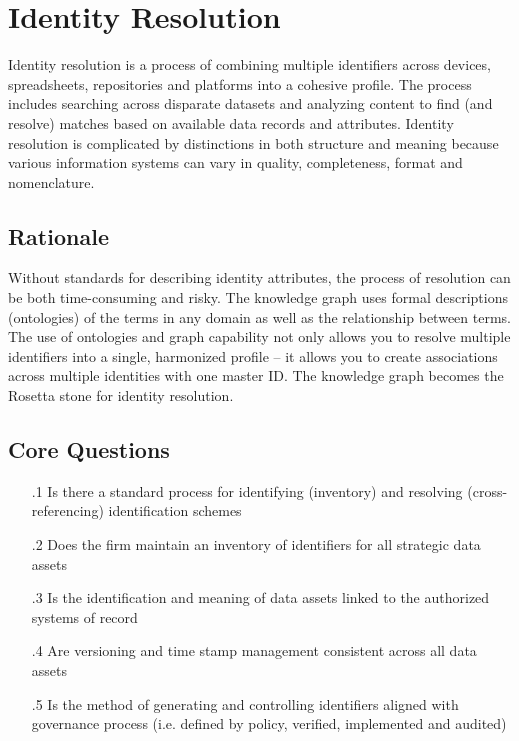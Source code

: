\section{Identity Resolution}\label{sec:b-2-1} %

Identity resolution is a process of combining multiple identifiers across devices, spreadsheets, repositories and
platforms into a cohesive profile.
The process includes searching across disparate datasets and analyzing content to find (and resolve) matches based
on available data records and attributes.
Identity resolution is complicated by distinctions in both structure and meaning because various information systems
can vary in quality, completeness, format and nomenclature.

\subsection*{ Rationale}

Without standards for describing identity attributes, the process of resolution can be both time-consuming and risky.
The knowledge graph uses formal descriptions (ontologies) of the terms in any domain as well as the relationship
between terms.
The use of ontologies and graph capability not only allows you to resolve multiple identifiers into a single,
harmonized profile -- it allows you to create associations across multiple identities with one master ID.
The knowledge graph becomes the Rosetta stone for identity resolution.

\subsection*{Core Questions}

\begin{itemize}[leftmargin=.5in]

  \item [\thesection.1] Is there a standard process for identifying (inventory) and resolving (cross-referencing)
                        identification schemes
  \item [\thesection.2] Does the firm maintain an inventory of identifiers for all strategic data assets
  \item [\thesection.3] Is the identification and meaning of data assets linked to the authorized systems of record
  \item [\thesection.4] Are versioning and time stamp management consistent across all data assets
  \item [\thesection.5] Is the method of generating and controlling identifiers aligned with governance process
                        (i.e. defined by policy, verified, implemented and audited)

\end{itemize}

